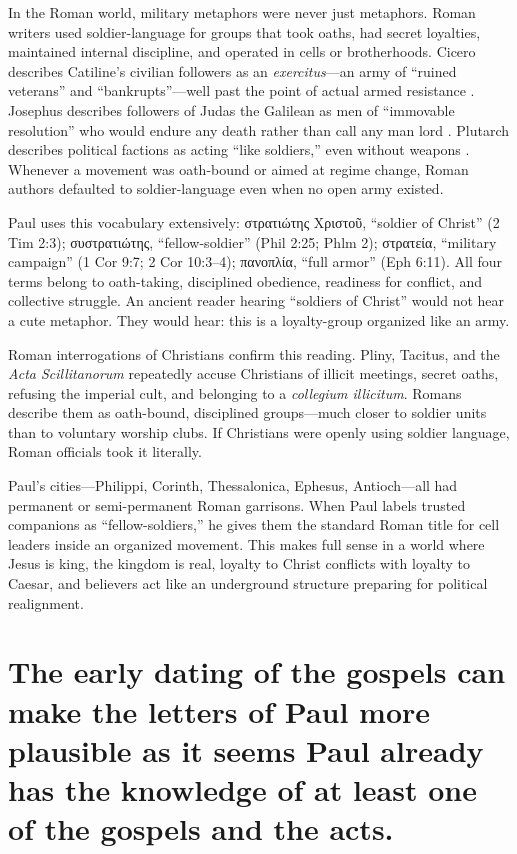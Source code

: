 In the Roman world, military metaphors were never just metaphors.
Roman writers used soldier-language for groups that took oaths, had secret loyalties, maintained internal discipline, and operated in cells or brotherhoods.
Cicero describes Catiline's civilian followers as an \emph{exercitus}---an army of ``ruined veterans'' and ``bankrupts''---well past the point of actual armed resistance \cite[2.5]{cicero:catilinam}.
Josephus describes followers of Judas the Galilean as men of ``immovable resolution'' who would endure any death rather than call any man lord \cite[18.23]{josephus:ant}.
Plutarch describes political factions as acting ``like soldiers,'' even without weapons \cite[Life of Sertorius 26]{plutarch:lives}.
Whenever a movement was oath-bound or aimed at regime change, Roman authors defaulted to soldier-language even when no open army existed.

Paul uses this vocabulary extensively: στρατιώτης Χριστοῦ, ``soldier of Christ'' (2 Tim 2:3); συστρατιώτης, ``fellow-soldier'' (Phil 2:25; Phlm 2); στρατεία, ``military campaign'' (1 Cor 9:7; 2 Cor 10:3--4); πανοπλία, ``full armor'' (Eph 6:11).
All four terms belong to oath-taking, disciplined obedience, readiness for conflict, and collective struggle.
An ancient reader hearing ``soldiers of Christ'' would not hear a cute metaphor.
They would hear: this is a loyalty-group organized like an army.

Roman interrogations of Christians confirm this reading.
Pliny, Tacitus, and the \emph{Acta Scillitanorum} \cite{actascillitanorum} repeatedly accuse Christians of illicit meetings, secret oaths, refusing the imperial cult, and belonging to a \emph{collegium illicitum}.
Romans describe them as oath-bound, disciplined groups---much closer to soldier units than to voluntary worship clubs.
If Christians were openly using soldier language, Roman officials took it literally.

Paul's cities---Philippi, Corinth, Thessalonica, Ephesus, Antioch---all had permanent or semi-permanent Roman garrisons.
When Paul labels trusted companions as ``fellow-soldiers,'' he gives them the standard Roman title for cell leaders inside an organized movement.
This makes full sense in a world where Jesus is king, the kingdom is real, loyalty to Christ conflicts with loyalty to Caesar, and believers act like an underground structure preparing for political realignment.

\section{The early dating of the gospels can make the letters of Paul more plausible as it seems Paul already has the knowledge of at least one of the gospels and the acts.}\label{sec:the-early-dating-of-the-gospels-can-make-the-letters-of-paul-more-plausible-as-it-seems-paul-already-has-the-knowledge-of-at-least-one-of-the-gospels-and-the-acts.}

